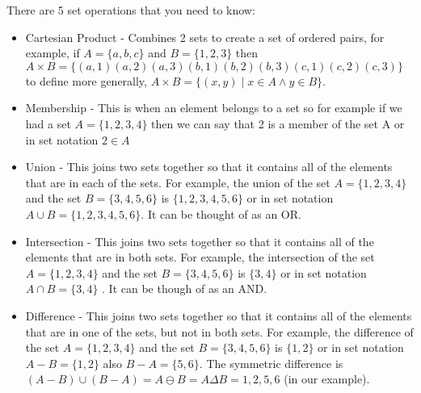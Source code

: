   There are 5 set operations that you need to know:
  \begin{itemize}
  	\item Cartesian Product - Combines 2 sets to create a set of ordered pairs, for example, if $A=\{a,b,c\}$ and $B=\{1,2,3\}$ then $A\times B = \{
  	\left(a,1\right)
  	\left(a,2\right)
  	\left(a,3\right)
  	\left(b,1\right)
  	\left(b,2\right)
  	\left(b,3\right)
  	\left(c,1\right)
  	\left(c,2\right)
  	\left(c,3\right)
  	\}$ to define more generally, $A \times B = \{(x,y) \mid x \in A \wedge y \in B\}$.
  	\item Membership - This is when an element belongs to a set so for example if we had a set $A=\{1,2,3,4\}$ then we can say that 2 is a member of the set A or in set notation $2\in A$
  	
  	\item Union - This joins two sets together so that it contains all of the elements that are in each of the sets. For example, the union of the set $A=\{1,2,3,4\}$ and the set $B=\{3,4,5,6\}$ is $\{1,2,3,4,5,6\}$ or in set notation $A \cup B = \{1,2,3,4,5,6\}$. It can be thought of as an OR.
  	
  	\item Intersection - This joins two sets together so that it contains all of the elements that are in both sets. For example, the intersection of the set $A=\{1,2,3,4\}$ and the set $B=\{3,4,5,6\}$ is $\{3,4\}$ or in set notation $A \cap B = \{3,4\}$ . It can be though of as an AND.
  	
  	\item Difference - This joins two sets together so that it contains all of the elements that are in one of the sets, but not in both sets. For example, the difference of the set $A=\{1,2,3,4\}$ and the set $B=\{3,4,5,6\}$ is $\{1,2\}$ or in set notation $A - B = \{1,2\}$ also $B - A = \{5,6\}$. The symmetric difference is $(A - B)\cup(B - A) = A \ominus B = A \Delta B = {1,2,5,6}$ (in our example).
  \end{itemize}
  
